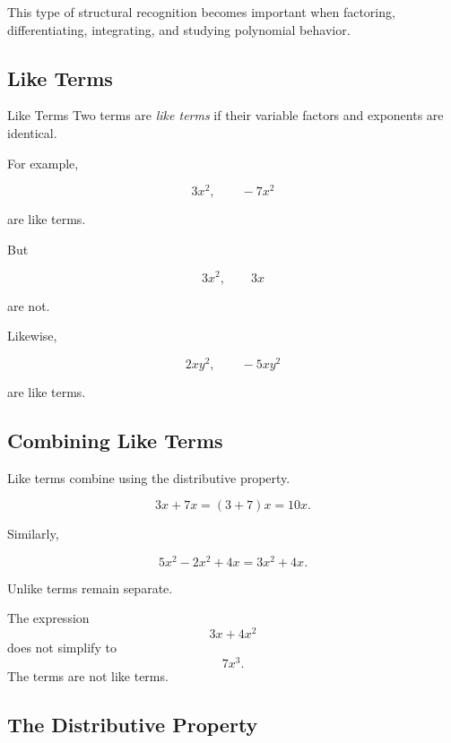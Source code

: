 This type of structural recognition becomes important when factoring,
differentiating, integrating, and studying polynomial behavior.

\subsection{Like Terms}
\label{subsec:like-terms}

\begin{definitionbox}{Like Terms}
Two terms are \emph{like terms} if their variable factors and exponents are
identical.
\end{definitionbox}

For example,

\[ 3x^2,\qquad -7x^2 \]

are like terms.

But

\[ 3x^2,\qquad 3x \]

are not.

Likewise,

\[ 2xy^2,\qquad -5xy^2 \]

are like terms.

\subsection{Combining Like Terms}
\label{subsec:combining-like-terms}

Like terms combine using the distributive property.

\[ 3x+7x=(3+7)x=10x. \]

Similarly,

\[ 5x^2-2x^2+4x=3x^2+4x. \]

Unlike terms remain separate.

\begin{warningbox}
The expression
\[ 3x+4x^2 \]
does not simplify to
\[ 7x^3. \]
The terms are not like terms.
\end{warningbox}

\subsection{The Distributive Property}
\label{subsec:distributive-property}

